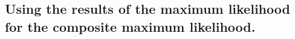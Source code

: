\documentclass[11pt, a4paper]{article}
\begin{document}
\begin{comment}
So derivating under the $_int$ and composing with the log-function, one have :
\begin{equation}
\frac{\partial \mathrm{H}_{(\mu',\Sigma ' \mid X)}}{\partial \sigma_{11}} (Y_1,Y_2) =\frac{\int_{\mathbb{R}^2}( \frac{(-) \sigma_{22}}{2 (\mid \sigma_{12}^2- \sigma_{11} \sigma_{22} \mid)^{\frac{3}{2}}} - ( \frac{\sigma_{12} z_{2} - \sigma_{22} z_{1} - \sigma_{11} z_2}{\sigma_{12}^2- \sigma_{11} \sigma_{22}})^2 ) \mathrm{h}_{(\mu',\Sigma' \mid X)}(z_1,z_2,Y_1,Y_2) \mathrm{d}z_1 \mathrm{d}z_2} {\int_{\mathbb{R}^2 }\mathrm{h}_{(\mu',\Sigma' \mid X)}(z_1,z_2,Y_1,Y_2) \mathrm{d}z_1 \mathrm{d}z_2}
\end{equation}

\subsubsection{With respect to $\sigma_{12}$}
We use the same notation than in the previous section for the derivative with respect to $\sigma_{12}$ fo the mornalization term of the normale distribution density function.\\
We have :
\begin{equation}
\frac{\partial g_{(0,\Sigma ')}}{\partial \sigma_{12}} (z_1,z_2) = (\frac{(-) \sigma_{12}}{\mid \sigma_{12}^2 - \sigma_{11} \sigma_{22} \mid} + \frac{\sigma_{12} ( 2 \sigma_{11} z_1 + 2 \sigma_{22} z _1 - \sigma_{11} \sigma{22} z_1 z_2}{(\sigma_{12}^2 - \sigma_{11} \sigma_{22})^2})  g_{(0,\Sigma ')}(z_1,z_2)
\end{equation}

So :
\begin{equation}
\frac{\partial \mathrm{H}_{(\mu',\Sigma ' \mid X)}}{\partial \sigma_{12}} (Y_1,Y_2) =\frac{\int_{\mathbb{R}^2}(\frac{(-) \sigma_{12}}{\mid \sigma_{12}^2 - \sigma_{11} \sigma_{22} \mid} + \frac{\sigma_{12} ( 2 \sigma_{11} z_1 + 2 \sigma_{22} z _1 - \sigma_{11} \sigma{22} z_1 z_2}{(\sigma_{12}^2 - \sigma_{11} \sigma_{22})^2}) \mathrm{h}_{(\mu',\Sigma' \mid X)}(z_1,z_2,Y_1,Y_2) \mathrm{d}z_1 \mathrm{d}z_2} {\int_{\mathbb{R}^2 }\mathrm{h}_{(\mu',\Sigma' \mid X)}(z_1,z_2,Y_1,Y_2) \mathrm{d}z_1 \mathrm{d}z_2}
\end{equation}
\end{comment}

\subsection{Using the results of the maximum likelihood for the composite maximum likelihood.}
\end{document}
